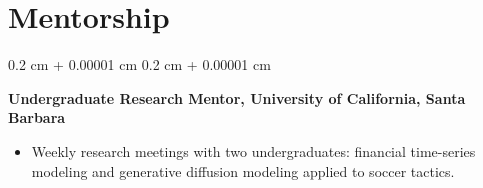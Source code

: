 \documentclass[10pt, letterpaper]{article}
\newenvironment{highlights}{
    \begin{itemize}[
        topsep=0.05 cm,
        parsep=0.05 cm,
        partopsep=0pt,
        itemsep=0pt,
        leftmargin=0.4 cm + 10pt
    ]
}{
    \end{itemize}
} %
\newenvironment{onecolentry}{
    \begin{adjustwidth}{
        0.2 cm + 0.00001 cm
    }{
        0.2 cm + 0.00001 cm
    }
}{
    \end{adjustwidth}
} %
\newenvironment{twocolentry}[2][]{
    \onecolentry
    \def\secondColumn{#2}
    \setcolumnwidth{\fill, 4.5 cm}
    \begin{paracol}{2}
}{
    \switchcolumn \raggedleft \secondColumn
    \end{paracol}
    \endonecolentry
} %
\begin{document}
        \vspace{-0.2cm}

\section{Mentorship}
    \begin{onecolentry}
        \textbf{Undergraduate Research Mentor, University of California, Santa Barbara}
        \begin{highlights}
            \item Weekly research meetings with two undergraduates: financial time-series modeling and generative diffusion modeling applied to soccer tactics.
        \end{highlights}
    \end{onecolentry}


            
            


            
            

\end{document}
